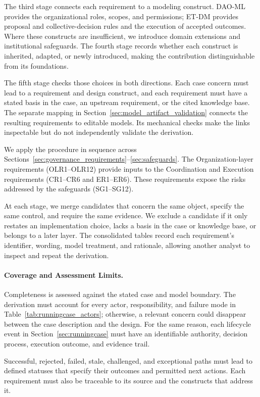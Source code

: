 \documentclass[journal]{IEEEtran}
\begin{document}
The third stage connects each requirement to a modeling construct.
DAO-ML provides the organizational roles, scopes, and permissions;
ET-DM provides proposal and collective-decision rules and the execution
of accepted outcomes. Where these constructs are insufficient, we
introduce domain extensions and institutional safeguards. The fourth
stage records whether each construct is inherited, adapted, or newly
introduced, making the contribution distinguishable from its foundations.

The fifth stage checks those choices in both directions. Each case
concern must lead to a requirement and design construct, and each
requirement must have a stated basis in the case, an upstream requirement,
or the cited knowledge base. The separate mapping in
Section~\ref{sec:model_artifact_validation} connects the resulting
requirements to editable models. Its mechanical checks make the links
inspectable but do not independently validate the derivation.

We apply the procedure in sequence across
Sections~\ref{sec:governance_requirements}--\ref{sec:safeguards}.
The Organization-layer requirements (OLR1--OLR12) provide
inputs to the Coordination and Execution requirements
(CR1--CR6 and ER1--ER6). These requirements expose the risks
addressed by the safeguards (SG1--SG12).

At each stage, we merge candidates that concern the same
object, specify the same control, and require the same evidence.
We exclude a candidate if it only restates an implementation
choice, lacks a basis in the case or knowledge base, or belongs
to a later layer. The consolidated tables record each
requirement's identifier, wording, model treatment, and rationale,
allowing another analyst to inspect and repeat the derivation.

\paragraph{Coverage and Assessment Limits.}

Completeness is assessed against the stated case and model boundary.
The derivation must account for every actor, responsibility, and failure
mode in Table~\ref{tab:runningcase_actors}; otherwise, a relevant concern
could disappear between the case description and the design.
For the same reason, each lifecycle event in
Section~\ref{sec:runningcase} must have an identifiable authority,
decision process, execution outcome, and evidence trail.

Successful, rejected, failed, stale, challenged, and exceptional
paths must lead to defined statuses that specify their outcomes
and permitted next actions. Each requirement must also be
traceable to its source and the constructs that address it.
\end{document}
